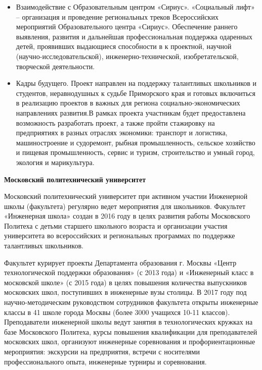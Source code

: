 \begin{enumerate}
\begin{itemize}
        \item Взаимодействие с Образовательным центром «Сириус». «Социальный лифт» – организация и проведение региональных треков Всероссийских мероприятий Образовательного центра «Сириус». Обеспечение раннего выявления, развития и дальнейшая профессиональная поддержка одаренных детей, проявивших выдающиеся способности в к проектной, научной (научно-исследовательской), инженерно-технической, изобретательской, творческой деятельности.
        \item Кадры будущего. Проект направлен на поддержку талантливых школьников и студентов, неравнодушных к судьбе Приморского края и готовых включиться в реализацию проектов в важных для региона социально-экономических направлениях развития.В рамках проекта участникам будет предоставлена возможность разработать проект, а также пройти стажировку на предприятиях в разных отраслях экономики: транспорт и логистика, машиностроение и судоремонт, рыбная промышленность, сельское хозяйство и пищевая промышленность, сервис и туризм, строительство и умный город, экология и марикультура.
    \end{itemize}
\end{enumerate}

\textbf{Московский политехнический университет}

Московский политехнический университет при активном участии Инженерной школы (факультета) регулярно ведет мероприятия для школьников. Факультет «Инженерная школа» создан в 2016 году в целях развития работы Московского Политеха с детьми старшего школьного возраста и организации участия университета во всероссийских и региональных программах по поддержке талантливых школьников.

Факультет курирует проекты Департамента образования г. Москвы «Центр технологической поддержки образования» (с 2013 года) и «Инженерный класс в московской школе» (с 2015 года) в целях повышения количества выпускников московских школ, поступивших в инженерные вузы столицы. В 2017 году под научно-методическим руководством сотрудников факультета открыты инженерные классы в 41 школе города Москвы (более 3000 учащихся 10-11 классов). Преподаватели инженерной школы ведут занятия в технологических кружках на базе Московского Политеха, курсы повышения квалификации для преподавателей московских школ, организуют инженерные соревнования и профориентационные мероприятия: экскурсии на предприятия, встречи с носителями профессионального опыта, инженерные турниры и соревнования.


